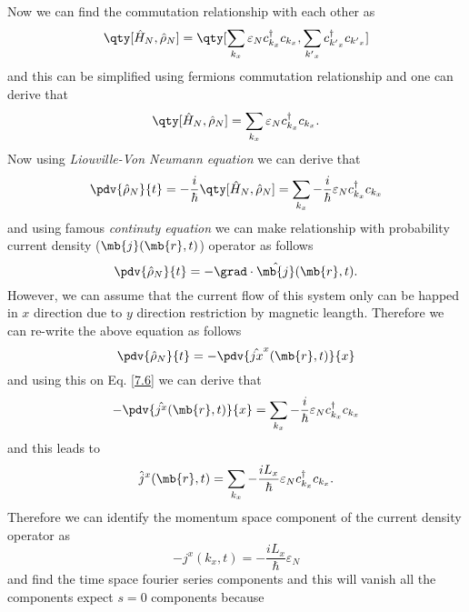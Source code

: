 \noindent
Now we can find the commutation relationship with each other as
\begin{equation} \label{7.4}
  \qty[\hat{H}_N , \hat{\rho}_N] =
  \qty[ \sum_{k_x} \varepsilon_N c_{k_x}^{\dagger}c_{k_x},
  \sum_{{k'}_x} c_{{k'}_x}^{\dagger}c_{{k'}_x}]
\end{equation}
and this can be simplified using fermions commutation relationship and one can derive that
\begin{equation} \label{7.5}
  \qty[\hat{H}_N , \hat{\rho}_N] =
   \sum_{k_x} \varepsilon_N c_{k_x}^{\dagger}c_{k_x}.
\end{equation}
Now using \textit{Liouville-Von Neumann equation} we can derive that
\begin{equation} \label{7.6}
  \pdv{\hat{\rho}_N}{t} =
   -\frac{i}{\hbar}\qty[\hat{H}_N , \hat{\rho}_N] =
   \sum_{k_x} -\frac{i}{\hbar}\varepsilon_N c_{k_x}^{\dagger}c_{k_x}
\end{equation}
and using famous \textit{continuty equation} we can make relationship with probability current density ($\mb{j}(\mb{r},t)$) operator as follows
\begin{equation} \label{7.7}
  \pdv{\hat{\rho}_N}{t} = - \grad \cdot \hat{\mb{j}}(\mb{r},t).
\end{equation}
However, we can assume that the current flow of this system only can be happed in $x$ direction due to $y$ direction restriction by magnetic leangth. Therefore we can re-write the above equation as follows
\begin{equation} \label{7.8}
  \pdv{\hat{\rho}_N}{t} = - \pdv{\hat{jx}^x(\mb{r},t)}{x}
\end{equation}
and using this on Eq. \eqref{7.6} we can derive that
\begin{equation} \label{7.9}
 - \pdv{\hat{j^x}(\mb{r},t)}{x} =
 \sum_{k_x} -\frac{i}{\hbar}\varepsilon_N c_{k_x}^{\dagger}c_{k_x}
\end{equation}
and this leads to
\begin{equation} \label{7.10}
 \hat{j}^x(\mb{r},t) =
 \sum_{k_x} -\frac{i L_x}{\hbar}\varepsilon_N c_{k_x}^{\dagger}c_{k_x}.
\end{equation}
Therefore we can identify the momentum space component of the current density operator as
\begin{equation} \label{7.11}
 - {j}^x(k_x,t) =
 -\frac{i L_x}{\hbar}\varepsilon_N
\end{equation}
and find the time space fourier series components and this will vanish all the components expect $s=0$ components because
